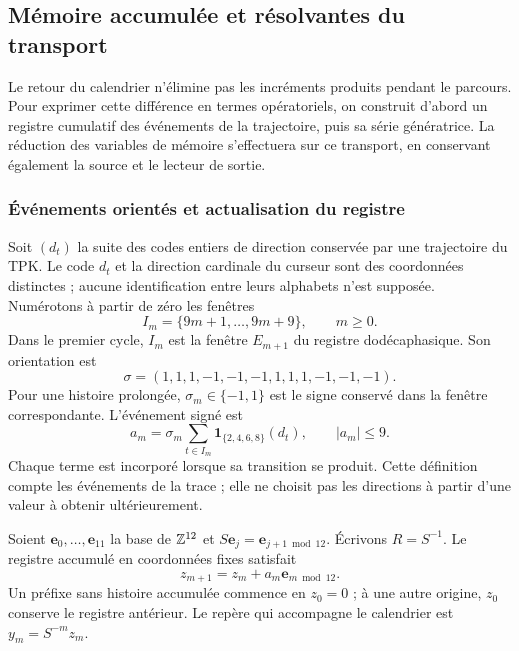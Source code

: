 \subsection{Mémoire accumulée et résolvantes du transport}
\label{subsec:memoria-resolvente}

Le retour du calendrier n'élimine pas les incréments produits pendant
le parcours. Pour exprimer cette différence en termes opératoriels, on construit
d'abord un registre cumulatif des événements de la trajectoire, puis sa
série génératrice. La réduction des variables de mémoire s'effectuera sur
ce transport, en conservant également la source et le lecteur de sortie.

\subsubsection{Événements orientés et actualisation du registre}

Soit \((d_t)\) la suite des codes entiers de direction conservée
par une trajectoire du TPK. Le code \(d_t\) et la direction cardinale
du curseur sont des coordonnées distinctes ; aucune identification
entre leurs alphabets n'est supposée. Numérotons à partir de zéro les fenêtres
\[
 I_m=\{9m+1,\ldots,9m+9\},\qquad m\geq0.
\]
Dans le premier cycle, \(I_m\) est la fenêtre \(E_{m+1}\) du registre dodécaphasique. Son orientation est
\[
 \sigma=(1,1,1,-1,-1,-1,1,1,1,-1,-1,-1).
\]
Pour une histoire prolongée, \(\sigma_m\in\{-1,1\}\) est le signe
conservé dans la fenêtre correspondante. L’événement signé est
\begin{equation}
 a_m=\sigma_m\sum_{t\in I_m}
       \mathbf1_{\{2,4,6,8\}}(d_t),\qquad |a_m|\leq9.
 \label{mem:evento}
\end{equation}
Chaque terme est incorporé lorsque sa transition se produit. Cette définition
compte les événements de la trace ; elle ne choisit pas les directions à partir d'une valeur
à obtenir ultérieurement.

Soient \(\mathbf e_0,\ldots,\mathbf e_{11}\) la base de \(\mathbb Z^{12}\)
et \(S\mathbf e_j=\mathbf e_{j+1\bmod12}\). Écrivons
\(R=S^{-1}\). Le registre accumulé en coordonnées fixes satisfait
\[
z_{m+1}=z_m+a_m\mathbf e_{m\bmod12}.
\]
Un préfixe sans histoire accumulée commence en \(z_0=0\) ; à une autre
origine, \(z_0\) conserve le registre antérieur.
Le repère qui accompagne le calendrier est \(y_m=S^{-m}z_m\).

